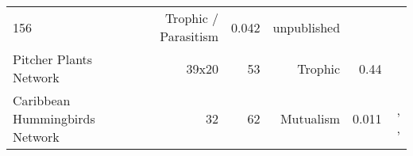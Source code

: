 \begin{longtable}[]{@{}lrrrrr@{}}
\begin{minipage}[t]{0.09\columnwidth}
156\strut
\end{minipage} & \begin{minipage}[t]{0.13\columnwidth}\raggedleft\strut
Trophic / Parasitism\strut
\end{minipage} & \begin{minipage}[t]{0.08\columnwidth}\raggedleft\strut
0.042\strut
\end{minipage} & \begin{minipage}[t]{0.27\columnwidth}\raggedleft\strut
unpublished\strut
\end{minipage}\tabularnewline
\begin{minipage}[t]{0.18\columnwidth}\raggedright\strut
Pitcher Plants Network\strut
\end{minipage} & \begin{minipage}[t]{0.08\columnwidth}\raggedleft\strut
39x20\strut
\end{minipage} & \begin{minipage}[t]{0.09\columnwidth}\raggedleft\strut
53\strut
\end{minipage} & \begin{minipage}[t]{0.13\columnwidth}\raggedleft\strut
Trophic\strut
\end{minipage} & \begin{minipage}[t]{0.08\columnwidth}\raggedleft\strut
0.44\strut
\end{minipage} & \begin{minipage}[t]{0.27\columnwidth}\raggedleft\strut
\citet{Baiser2012}\strut
\end{minipage}\tabularnewline
\begin{minipage}[t]{0.18\columnwidth}\raggedright\strut
Caribbean Hummingbirds Network\strut
\end{minipage} & \begin{minipage}[t]{0.08\columnwidth}\raggedleft\strut
32\strut
\end{minipage} & \begin{minipage}[t]{0.09\columnwidth}\raggedleft\strut
62\strut
\end{minipage} & \begin{minipage}[t]{0.13\columnwidth}\raggedleft\strut
Mutualism\strut
\end{minipage} & \begin{minipage}[t]{0.08\columnwidth}\raggedleft\strut
0.011\strut
\end{minipage} & \begin{minipage}[t]{0.27\columnwidth}\raggedleft\strut
\citet{MartinGonzalez2015}, \citet{Sonne2016}, \citet{Lack1973}\strut

\end{minipage}
\end{longtable}

